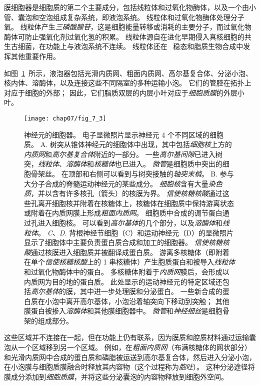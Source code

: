 膜细胞器是细胞质的第二个主要成分，包括线粒体和过氧化物酶体，以及一个由小管、囊泡和空泡组成复杂系统，即液泡系统。
线粒体和过氧化物酶体处理分子氧。
线粒体产生\textit{三磷酸腺苷}，这是细胞能量转移或消耗的主要分子，而过氧化物酶体可防止强氧化剂过氧化氢的积累。
线粒体源自在进化早期侵入真核细胞的共生古细菌，在功能上与液泡系统不连续。
线粒体还在~ 稳态和脂质生物合成中发挥其他重要作用。


如图~\ref{fig:7_3}~所示，液泡器包括光滑内质网、粗面内质网、高尔基复合体、分泌小泡、核内体、溶酶体，以及连接这些不同隔室的多种运输小泡。
它们的管腔在拓扑上对应于细胞的外部；
因此，它们脂质双层的内层小叶对应于\textit{细胞质膜}的外层小叶。


\begin{figure}[htbp]
	\centering
	\texttt{[image: chap07/fig\_7\_3]}
	\caption{神经元的细胞器。
		电子显微照片显示神经元 4 个不同区域的细胞质\cite{peters1991neuropil}。
		A. 树突从锥体神经元的细胞体中出现，其中包括\textit{细胞核}上方的\textit{内质网}和\textit{高尔基复合体}附近的一部分。
		一些\textit{高尔基间隙}已进入树突，\textit{线粒体}、\textit{溶酶体}和\textit{核糖体}也已进入。
		\textit{微管}是细胞质中突出的细胞骨架丝。
		在顶部和右侧可以看到与树突接触的\textit{轴突末梢}。
		B. 参与大分子合成的脊髓运动神经元的某些成分。
		\textit{细胞核}含有大量\textit{染色质}，并以含有许多核孔（箭头）的核膜为界。
		\textit{信使核糖核酸}通过这些孔离开细胞核并附着在核糖体上，核糖体在细胞质中保持游离状态或附着在内质网膜上形成\textit{粗面内质网}。
		细胞质中合成的调节蛋白通过孔进入细胞核。
		可以看到\textit{高尔基体}的几个部分，以及\textit{溶酶体}和\textit{线粒体}。
		\textit{C、D.} 背根神经节细胞（C）和运动神经元（D）的显微照片显示了细胞体中主要负责蛋白质合成和加工的细胞器。
		\textit{信使核糖核酸}通过核膜进入细胞质并被翻译成蛋白质。
		游离多核糖体（即附着在单个\textit{信使核糖核酸}上的 1 串核糖体）产生胞质蛋白和被导入\textit{线粒体}和过氧化物酶体中的蛋白。
		多核糖体附着于\textit{内质网}膜后，会形成以内质网为目的地的蛋白质。
		此处显示的运动神经元的特定区域还包括\textit{高尔基体}的膜，其中进一步处理膜和分泌蛋白。
		一些新合成的蛋白质在小泡中离开高尔基体，小泡沿着轴突向下移动到突触；
		其他膜蛋白被掺入\textit{溶酶体}和其他膜细胞器中。
		\textit{微管}和\textit{神经细丝}是细胞骨架的组成部分。}
	\label{fig:7_3}
\end{figure}


这些区域并不连接在一起，但在功能上仍有联系，因为膜质和腔质材料通过运输囊泡从一个区域移到另一个区域。
例如，在\textit{粗面内质网}（布满核糖体的网状部分）和光滑内质网中合成的蛋白质和磷脂被运送到高尔基复合体，然后进入分泌小泡，在小泡膜与细胞质膜融合时释放其内容物（这个过程称为\textit{胞吐}）。
这种分泌途径将膜成分添加到\textit{细胞质膜}，并将这些分泌囊泡的内容物释放到细胞外空间。


